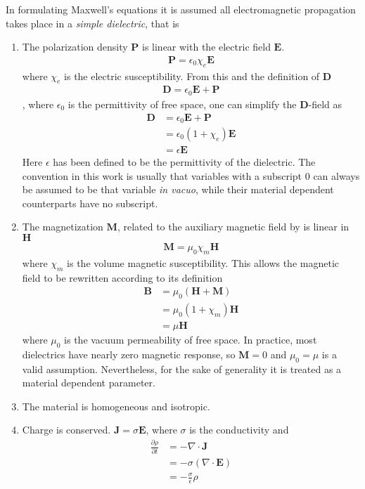 In formulating Maxwell's equations it is assumed all electromagnetic
propagation takes place in a {\it simple dielectric}, that is
\begin{enumerate}
\item The polarization density $\mathbf{P}$ is linear with the electric
field $\mathbf{E}$.  
\begin{align}
\mathbf{P}=\epsilon_0\chi_e\mathbf{E}
\label{eqn:pdensity}
\end{align}
where $\chi_e$ is the electric susceptibility.  From this and the definition
of $\mathbf{D}$
\begin{align}
\mathbf{D}=\epsilon_0\mathbf{E}+\mathbf{P}
\label{eqn:dfield}
\end{align},
where $\epsilon_0$ is the permittivity of free space, one can simplify the
$\mathbf{D}$-field as 
\begin{align}
\mathbf{D}&=\epsilon_0\mathbf{E}+\mathbf{P}\\
&=\epsilon_0(1+\chi_e)\mathbf{E}\\
&=\epsilon\mathbf{E}
\end{align}
Here $\epsilon$ has been defined to be the permittivity of the
dielectric.  The convention in this work is usually that variables with a
subscript $0$ can always be assumed to be that variable {\it in vacuo},
while their material dependent counterparts have no subscript.
\item The magnetization $\mathbf{M}$, related to the auxiliary magnetic
field by is linear in $\mathbf{H}$
\begin{align}
\mathbf{M}=\mu_0\chi_m\mathbf{H}
\end{align}
where $\chi_m$ is the volume magnetic susceptibility.  This allows the
magnetic field to be rewritten according to its definition
\begin{align}
\mathbf{B}&=\mu_0\left(\mathbf{H}+\mathbf{M}\right)\\
&=\mu_0\left(1+\chi_m\right)\mathbf{H}\\
&=\mu \mathbf{H}
\end{align}
where $\mu_0$ is the vacuum permeability of free space.  In practice, most
dielectrics have nearly zero magnetic response, so $\mathbf{M}=0$ and
$\mu_0=\mu$ is a valid assumption.  Nevertheless, for the sake of generality it is treated as a
material dependent parameter.
\item The material is homogeneous and isotropic.
\item Charge is conserved.  $\mathbf{J} = \sigma \mathbf{E}$, where
 $\sigma$ is the conductivity and
\begin{align}
 \frac{\partial \rho}{\partial t} 
  &= -\nabla \cdot \mathbf{J}\\
  &= -\sigma \left(\nabla \cdot \mathbf{E} \right) \\
  &= -\frac{\sigma}{\epsilon} \rho
\end{align}
\end{enumerate}
